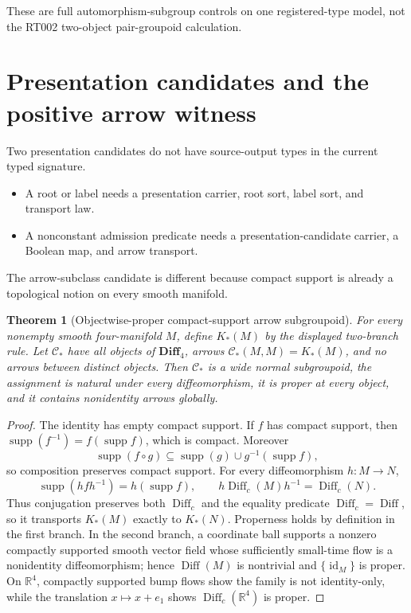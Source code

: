 \documentclass[11pt]{article}
\newtheorem{theorem}{Theorem}
\newcommand{\DiffFour}{\mathbf{Diff}_{4}}
\begin{document}
These are full automorphism-subgroup controls on one registered-type model,
not the RT002 two-object pair-groupoid calculation.

\section{Presentation candidates and the positive arrow witness}

Two presentation candidates do not have source-output types in the current
typed signature.
\begin{itemize}[leftmargin=2em]
  \item A root or label needs a presentation carrier, root sort, label sort,
        and transport law.
  \item A nonconstant admission predicate needs a presentation-candidate
        carrier, a Boolean map, and arrow transport.
\end{itemize}

The arrow-subclass candidate is different because compact support is already a
topological notion on every smooth manifold.

\begin{theorem}[Objectwise-proper compact-support arrow subgroupoid]
For every nonempty smooth four-manifold \(M\), define \(K_{\!*}(M)\) by the
displayed two-branch rule.  Let \(\mathcal{C}_{\!*}\) have all objects of
\(\DiffFour\), arrows
\(\mathcal{C}_{\!*}(M,M)=K_{\!*}(M)\), and no arrows between distinct objects.
Then \(\mathcal{C}_{\!*}\) is a wide normal subgroupoid, the assignment is
natural under every diffeomorphism, it is proper at every object, and it
contains nonidentity arrows globally.
\end{theorem}

\begin{proof}
The identity has empty compact support.  If \(f\) has compact support, then
\(\operatorname{supp}(f^{-1})=f(\operatorname{supp}f)\), which is compact.
Moreover
\[
 \operatorname{supp}(f\circ g)
 \subseteq \operatorname{supp}(g)\cup g^{-1}(\operatorname{supp}f),
\]
so composition preserves compact support.  For every diffeomorphism
\(h:M\to N\),
\[
 \operatorname{supp}(hfh^{-1})=h(\operatorname{supp}f),
 \qquad
 h\operatorname{Diff}_{c}(M)h^{-1}=\operatorname{Diff}_{c}(N).
\]
Thus conjugation preserves both \(\operatorname{Diff}_{c}\) and the equality
predicate \(\operatorname{Diff}_{c}=\operatorname{Diff}\), so it transports
\(K_{\!*}(M)\) exactly to \(K_{\!*}(N)\).  Properness holds by definition in
the first branch.  In the second branch, a coordinate ball supports a nonzero
compactly supported smooth vector field whose sufficiently small-time flow is
a nonidentity diffeomorphism; hence \(\operatorname{Diff}(M)\) is nontrivial
and \(\{\operatorname{id}_{M}\}\) is proper.  On \(\mathbb{R}^{4}\), compactly
supported bump flows show the family is not identity-only, while the
translation \(x\mapsto x+e_{1}\) shows
\(\operatorname{Diff}_{c}(\mathbb{R}^{4})\) is proper.
\end{proof}
\end{document}
